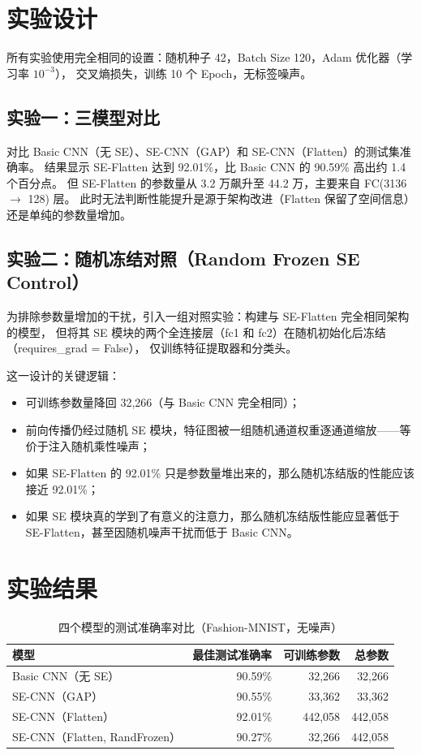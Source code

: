 \documentclass[12pt,a4paper]{ctexart}
\begin{document}
\section{实验设计}

所有实验使用完全相同的设置：随机种子 42，Batch Size 120，Adam 优化器（学习率 $10^{-3}$），
交叉熵损失，训练 10 个 Epoch，无标签噪声。

\subsection{实验一：三模型对比}

对比 Basic CNN（无 SE）、SE-CNN（GAP）和 SE-CNN（Flatten）的测试集准确率。
结果显示 SE-Flatten 达到 92.01\%，比 Basic CNN 的 90.59\% 高出约 1.4 个百分点。
但 SE-Flatten 的参数量从 3.2 万飙升至 44.2 万，主要来自 FC(3136 $\to$ 128) 层。
此时无法判断性能提升是源于架构改进（Flatten 保留了空间信息）还是单纯的参数量增加。

\subsection{实验二：随机冻结对照（Random Frozen SE Control）}

为排除参数量增加的干扰，引入一组对照实验：构建与 SE-Flatten 完全相同架构的模型，
但将其 SE 模块的两个全连接层（fc1 和 fc2）在随机初始化后冻结（requires\_grad = False），
仅训练特征提取器和分类头。

这一设计的关键逻辑：
\begin{itemize}[nosep]
    \item 可训练参数量降回 32,266（与 Basic CNN 完全相同）；
    \item 前向传播仍经过随机 SE 模块，特征图被一组随机通道权重逐通道缩放——等价于注入随机乘性噪声；
    \item 如果 SE-Flatten 的 92.01\% 只是参数量堆出来的，那么随机冻结版的性能应该接近 92.01\%；
    \item 如果 SE 模块真的学到了有意义的注意力，那么随机冻结版性能应显著低于 SE-Flatten，甚至因随机噪声干扰而低于 Basic CNN。
\end{itemize}

\section{实验结果}

\begin{table}[htbp]
\centering
\caption{四个模型的测试准确率对比（Fashion-MNIST，无噪声）}
\label{tab:results}
\begin{tabular}{lrrr}
\toprule
模型 & 最佳测试准确率 & 可训练参数 & 总参数 \\
\midrule
Basic CNN（无 SE） & 90.59\% & 32,266 & 32,266 \\
SE-CNN（GAP） & 90.55\% & 33,362 & 33,362 \\
SE-CNN（Flatten） & 92.01\% & 442,058 & 442,058 \\
SE-CNN（Flatten, RandFrozen） & 90.27\% & 32,266 & 442,058 \\
\bottomrule
\end{tabular}
\end{table}
\end{document}
